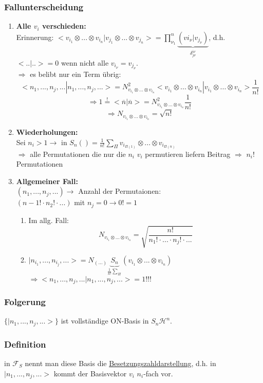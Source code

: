 \documentclass[twoside,a4paper]{scrartcl}
\renewcommand{\1}{\mathds{1}}
\newcommand{\Ra}{\Rightarrow}
\newcommand{\ra}{\rightarrow}
\renewcommand{\H}{\mathcal{H}}
\newcommand{\F}{\mathcal{F}}
\begin{document}
\subsubsection*{Fallunterscheidung} 
\begin{enumerate}
\item \textbf{Alle $v_i$ verschieden:}\\
Erinnerung: $<v_{i_1}\otimes ... \otimes v_{i_n}| v_{j_1}\otimes ... \otimes v_{j_n}>=\prod_{\nu_1}^n \underbrace{(v{i_\nu}|v_{j_\nu})}_{\delta_{j\nu}^{i\nu}}$, d.h. $<..|..>=0$ wenn nicht alle $v_{i_\nu}=v_{j_\nu}$.\\
$\Ra$ es belibt nur ein Term übrig:
$$<n_1,...,n_j,...|n_1,...,n_j,...>=N^2_{v_{i_1}\otimes ... \otimes v_{i_n}} <v_{i_1}\otimes ... \otimes v_{i_n}|v_{i_1}\otimes ... \otimes v_{i_n}>\frac{1}{n!}$$
$$\Ra 1 \stackrel{!}{=} <\overline{n}|\overline{n}>=N^2_{v_{i_1}\otimes ... \otimes v_{i_n}}\frac{1}{n!}$$
$$\Ra N_{v_{i_1}\otimes ... \otimes v_{i_n}}=\sqrt{n!} $$
\item \textbf{Wiederholungen:}\\
Sei $n_i>1 \ra$ in $S_n()=\frac{1}{n!}\sum_\Pi v_{i_{\Pi(1)}}\otimes ... \otimes v_{i_{\Pi(n)}}$ \\
$\Ra$ alle Permutationen die nur die $n_i$ $v_i$ permutieren liefern Beitrag $\Ra$ $n_i!$ Permutationen
\item \textbf{Allgemeiner Fall:}\\
$(n_1,...,n_j,...) \ra$ Anzahl der Permutaionen:\\
$(n-1! \cdot n_2!\cdot ...)$ mit $n_j=0 \ra 0!=1$
\begin{enumerate}
\item Im allg. Fall: $$ N_{v_{i_1}\otimes ... \otimes v_{i_n}}=\sqrt{\frac{n!}{n_1!\cdot ... \cdot n_j! \cdot ...}} $$
\item $|n_{i_1}, ... , n_{i_j},...>=N_{(...)} \underbrace{S_n}_{\frac{1}{n!}\sum_\Pi} (v_{i_1}\otimes ... \otimes v_{i_n})$\\
$\Ra <n_{1}, ... , n_{j},...|n_{1}, ... , n_{j},...>=1 !!!$
\end{enumerate}
\end{enumerate}
\subsubsection*{Folgerung} 
$\{|n_1,...,n_j,...> \}$ ist vollständige ON-Basis in $S_n\H^n$.
\subsubsection*{Definition} 
in $\F_S$ nennt man diese Basis die \underline{Besetzungszahldarstellung}, d.h. in $|n_1,...,n_j,...>$ kommt der Basisvektor $v_i$ $n_i$-fach vor.
\end{document}
